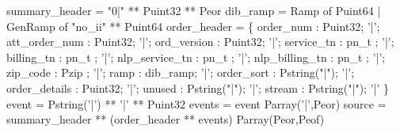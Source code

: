  summary\_header = "0|" ** Puint32 ** Peor
\mbox{}
 dib\_ramp = 
  Ramp of Puint64 
| GenRamp of "no\_ii" ** Puint64
\mbox{}
 order\_header = \{
       order\_num       : Puint32;
 '|';  att\_order\_num  : Puint32;             
 '|';  ord\_version     : Puint32;         
 '|';  service\_tn      : pn\_t ;
 '|';  billing\_tn      : pn\_t ;          
 '|';  nlp\_service\_tn : pn\_t ;
 '|';  nlp\_billing\_tn : pn\_t ;
 '|';  zip\_code        : Pzip ;
 '|';  ramp             : dib\_ramp; 
 '|';  order\_sort      : Pstring("|");
 '|';  order\_details   : Puint32;             
 '|';  unused           : Pstring("|");
 '|';  stream           : Pstring("|");
 '|'
\}
\mbox{}
 event  = Pstring('|') **  '|' ** Puint32
 events = event Parray('|',Peor)
 source = summary\_header **
                  (order\_header ** events) Parray(Peor,Peof)
